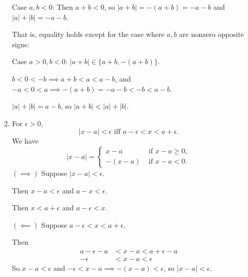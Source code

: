 \documentclass[a4paper,10pt]{book}
\theoremstyle{plain} %
\begin{document}
\begin{enumerate}
\begin{enumerate}[label=(\roman*),align=left]
		Case $a,b<0$: Then $a+b < 0 $, so $|a+b| = -(a+b) = -a-b$ and $|a|+|b| = -a- b$.\par
		That is, equality holds except for the case where $a,b$ are nonzero opposite signs:\par
		Case $a>0,b<0$: $|a+b| \in \{a+b, -(a+b)\}$.\par
		$b<0<-b \implies a+b<a<a-b$, and $-a<0<a \implies -(a+b)=-a-b<-b<a-b$.\par
		$|a|+|b| = a- b$, so $|a+b| < |a|+|b|$.
		\item For $\epsilon >0,$
		\[ |x-a| < \epsilon \text{  iff  } a - \epsilon < x < a + \epsilon.\]
		We have
		\[ 
		|x-a| =
		\begin{cases} 
			x-a & \text{ if } x-a \ge 0, \\
			-(x-a) & \text{ if } x-a < 0.
		\end{cases}
		\]
		$(\implies)$ Suppose $|x-a| < \epsilon$.\par
		Then $x-a < \epsilon$ and $a-x < \epsilon$.\par
		Then $x< a+\epsilon$ and $a-\epsilon<x$.\par
		$(\impliedby)$ Suppose $a - \epsilon < x < a + \epsilon$.\par
		Then
		\begin{align*}
		a - \epsilon-a &< x-a < a + \epsilon-a \\
		- \epsilon &< x-a < \epsilon
		\end{align*}
		So $x-a < \epsilon$ and $- \epsilon < x-a \implies -(x-a)< \epsilon$, so $|x-a| < \epsilon$.
	\end{enumerate}
\end{enumerate}
\end{document}
